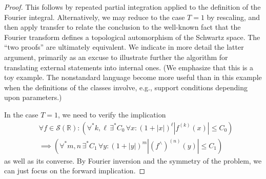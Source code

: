 \begin{proof}
  This follows by repeated partial integration applied to the definition of the Fourier integral.  Alternatively, we may reduce to the case $T = 1$ by rescaling, and then apply transfer to relate the conclusion to the well-known fact that the Fourier transform defines a topological automorphism of the Schwartz space.  The ``two proofs'' are ultimately equivalent.  We indicate in more detail the latter argument, primarily as an excuse to illustrate further the algorithm for translating external statements into internal ones.  (We emphasize that this is a toy example.  The nonstandard language become more useful than in this example when the definitions of the classes involve, e.g., support conditions depending upon parameters.)

  In the case $T = 1$, we need to verify the implication
  \begin{align*}
    &\forall f \in \mathcal{S}(\mathbb{R}) :
      (  \forall^* k,  \ell \,
      \exists^* C_0 \,
      \forall x :
      (1 + |x|)^\ell |f^{(k)}(x)| \leq C_0
      )
    \\
    &\implies
      (  \forall^* m,  n \,
      \exists^* C_1 \,
      \forall y :
      (1 + |y|)^m |(f^\wedge)^{(n)}(y)| \leq C_1
      )
  \end{align*}
  as well as its converse.  By Fourier inversion and the symmetry of the problem, we can just focus on the forward implication.


\end{proof}
